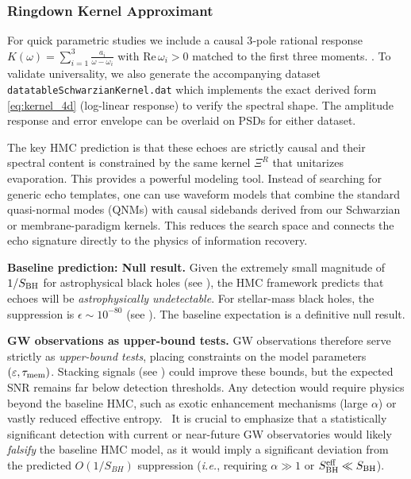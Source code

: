 \documentclass[11pt,a4paper]{article}
\newcommand{\ie}{\textit{i.e.}\xspace}
\newcommand{\HMC}{\textsc{HMC}\xspace}
\theoremstyle{plain}
\theoremstyle{definition}
\theoremstyle{remark}
\begin{document}
\subsubsection{Ringdown Kernel Approximant}
For quick parametric studies we include a causal 3‑pole rational response
$K(\omega)=\sum_{i=1}^3\frac{a_i}{\omega-\omega_i}$ with $\mathrm{Re}\,\omega_i>0$ matched to the
first three moments.
\cite{Cardoso:2016, Abedi:2017}. To validate universality, we also generate
the accompanying dataset \texttt{datatableSchwarzianKernel.dat} which implements the exact derived form \eqref{eq:kernel_4d} (log-linear response) to verify the spectral shape.
The amplitude response and error envelope can be overlaid on PSDs for either dataset.

The key \HMC{} prediction is that these echoes are strictly causal and their spectral content is constrained by the same kernel $\Xi^R$ that unitarizes evaporation. This provides a powerful modeling tool. Instead of searching for generic echo templates, one can use waveform models that combine the standard quasi-normal modes (QNMs) with causal sidebands derived from our Schwarzian or membrane-paradigm kernels. This reduces the search space and connects the echo signature directly to the physics of information recovery. 

\textbf{Baseline prediction: Null result.} Given the extremely small magnitude of $1/S_{\rm BH}$ for astrophysical black holes (see ), the \HMC{} framework predicts that echoes will be \emph{astrophysically undetectable}. For stellar-mass black holes, the suppression is $\epsilon\sim 10^{-80}$ (see ). The baseline expectation is a definitive null result.

\textbf{GW observations as upper-bound tests.} GW observations therefore serve strictly as \emph{upper-bound tests}, placing constraints on the model parameters $(\varepsilon,\tau_{\rm mem})$. Stacking signals (see ) could improve these bounds, but the expected SNR remains far below detection thresholds. Any detection would require physics beyond the baseline \HMC{}, such as exotic enhancement mechanisms (large $\alpha$) or vastly reduced effective entropy.
\ It is crucial to emphasize that a statistically significant detection with current or near-future GW observatories would likely \emph{falsify} the baseline \HMC{} model, as it would imply a significant deviation from the predicted $O(1/S_{BH})$ suppression (\ie, requiring $\alpha \gg 1$ or $S_{\rm BH}^{\rm eff} \ll S_{\rm BH}$).
\end{document}
